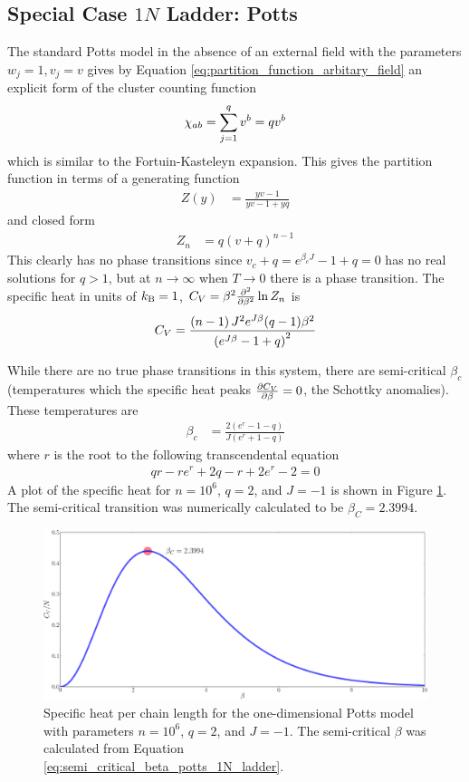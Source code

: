 \subsection{Special Case \texorpdfstring{$1N$}{1N} Ladder: Potts}

The standard Potts model in the absence of an external field with the parameters $w_j=1, v_j=v$ gives by Equation \ref{eq:partition_function_arbitary_field} an explicit form of the cluster counting function
\begin{equation}
\chi_{a b} = \sum_{j=1}^{q} v^b = q v^b 
\end{equation}
which is similar to the Fortuin-Kasteleyn expansion. This gives the partition function in terms of a generating function
\begin{align}
Z(y)  &= \frac{yv - 1}{y v - 1 + y q}
\end{align}
and closed form
\begin{align}
Z_n   &= q(v+q)^{n-1}
\label{eq:1N_ladder_potts_closed_form}
\end{align}
This clearly has no phase transitions since $v_c+q = e^{\beta_c J} - 1 + q = 0$ has no real solutions for $q>1$, but at $n \rightarrow \infty$ when $T \rightarrow 0$ there is a phase transition. The specific heat in units of $k_{\mathrm{B}}=1$, $C_V = \beta^2 \frac{\partial ^2}{\partial \beta^2} \ln Z_n$ is
\begin{equation}
C_V = {\frac { \left(  n-1  \right) {J}^{2}{{e}^{J\beta}} ( q-1
 ) {\beta}^{2}}{ \left(  {{e}^{J\beta}}-1+q \right)^{2}}}
\end{equation}

While there are no true phase transitions in this system, there are semi-critical $\beta_c$ (temperatures which the specific heat peaks $\frac{\partial C_V}{\partial \beta}=0$, the Schottky anomalies). These temperatures are
\begin{align}
\label{eq:semi_critical_beta_potts_1N_ladder}
\beta_c &= \frac{2 (e^r - 1 - q)}{J (e^r + 1 - q)}
\end{align}
%
where $r$ is the root to the following transcendental equation
%
\begin{align}
qr-re^r+2q-r+2e^r-2 = 0
\end{align}
%
A plot of the specific heat for $n=10^6$, $q=2$, and $J=-1$ is shown in Figure \ref{fig:CV_curve_potts_1N_ladder}. The semi-critical transition was numerically calculated to be $\beta_C = 2.3994$.
%
\begin{figure}[ht]
\includegraphics[width=.7 \textwidth]{pictures/1N_potts_ladder/pictures/CV_curve_potts_1N_ladder.pdf}
\caption{Specific heat per chain length for the one-dimensional Potts model with parameters $n=10^6$, $q=2$, and $J=-1$. The semi-critical $\beta$ was calculated from Equation \ref{eq:semi_critical_beta_potts_1N_ladder}. }
\label{fig:CV_curve_potts_1N_ladder}
\end{figure}
%

